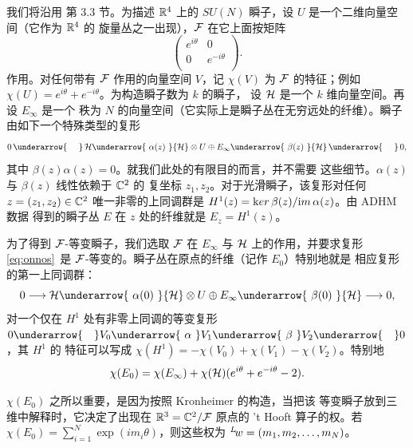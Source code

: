 我们将沿用 \cite{ref126} 第 3.3 节。为描述 $\Bbb{R}^4$ 上的
$SU(N)$ 瞬子，设 $U$ 是一个二维向量空间（它作为 $\Bbb{R}^4$ 的
旋量丛之一出现），${\EUF}$ 在它上面按矩阵 %
\setcounter{equation}{5}
\begin{equation}\label{eq:normalo}
\left(\begin{matrix}e^{i\theta}
& 0 \\ 0 & e^{-i\theta}\\\end{matrix}\right).
\end{equation}
作用。对任何带有 ${\EUF}$ 作用的向量空间 $V$，记 $\chi(V)$ 为
${\EUF}$ 的特征；例如
$\chi(U)=e^{i\theta}+e^{-i\theta}$。为构造瞬子数为 $k$ 的瞬子，
设 ${{\EUH}}$ 是一个 $k$ 维向量空间。再设 $E_\infty$ 是一个
秩为 $N$ 的向量空间（它实际上是瞬子丛在无穷远处的纤维）。瞬子
由如下一个特殊类型的复形
\setcounter{equation}{6}
\begin{equation}\label{eq:onnos}
0\,\underarrow{~~~~}\,{{\EUH}}\underarrow{\,\,\alpha(z)\,\,}{{\EUH}}\otimes
U\oplus E_\infty\underarrow{\,\,\beta(z)\,\,}
{{\EUH}}\,\underarrow{~~~~}\, 0,
\end{equation}
 其中 $\beta(z)\alpha(z)=0$。就我们此处的有限目的而言，并不需要
这些细节。$\alpha(z)$ 与 $\beta(z)$ 线性依赖于 $\Bbb{C}^2$ 的
复坐标 $z_1,z_2$。对于光滑瞬子，该复形对任何
$z=(z_1,z_2)\in \Bbb{C}^2$ 唯一非零的上同调群是
$H^1(z)={\rm ker}\,\beta(z)/{\rm im}\,\alpha(z)$。由 ADHM 数据
得到的瞬子丛 $E$ 在 $z$ 处的纤维就是 $E_z=H^1(z)$。

为了得到 ${\EUF}$-等变瞬子，我们选取 ${\EUF}$ 在 $E_\infty$ 与
${{\EUH}}$ 上的作用，并要求复形 \eqref{eq:onnos}\ 是
${\EUF}$-等变的。瞬子丛在原点的纤维（记作 $E_0$）特别地就是
相应复形的第一上同调群：
\setcounter{equation}{7}
\begin{equation}\label{eq:otonos}
0\longrightarrow{{\EUH}}\underarrow{\,\,\alpha(0)\,\,}{{\EUH}}\otimes
U\oplus E_\infty\underarrow{\,\,\beta(0)\,\,}
{{\EUH}}\longrightarrow 0,
\end{equation}
 对一个仅在 $H^1$ 处有非零上同调的等变复形
$0\underarrow{~~~} V_0\underarrow{\,\,\alpha\,\,}
V_1\underarrow{\,\,\beta\,\,} V_2\underarrow{~~~} 0$，其 $H^1$ 的
特征可以写成
$\chi(H^1)=-\chi(V_0)+\chi(V_1)-\chi(V_2)$。特别地
\setcounter{equation}{8}
\begin{equation}\label{eq:onsno}
\chi(E_0)=\chi(E_\infty)+\chi({{\EUH}})(e^{i\theta}+e^{-i\theta}-2).
\end{equation}

$\chi(E_0)$ 之所以重要，是因为按照 Kronheimer 的构造，当把该
等变瞬子放到三维中解释时，它决定了出现在
$\Bbb{R}^3=\Bbb{C}^2/{\EUF}$ 原点的 't Hooft 算子的权。若
$\chi(E_0)=\sum_{i=1}^N\exp({im_i\theta})$，则这些权为
$^L\negthinspace w=(m_1,m_2,\dots,m_N)$。

